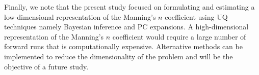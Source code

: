 


 
Finally, we note that the present study focused on formulating and estimating a low-dimensional representation
of the Manning's $n$ coefficient using UQ techniques namely Bayesian inference and PC expansions.  A high-dimensional representation of the Manning's $n$ coefficient would require a large number of forward runs that is computationally expensive.  Alternative methods can be implemented to reduce the dimensionality of the problem and will be the objective of a future study.